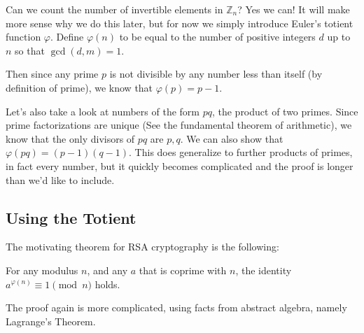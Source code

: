 \documentclass{article}
\begin{document}
Can we count the number of invertible elements in $\mathbb{Z}_n$? Yes we can! It will make more sense why we do this later, but for now we simply introduce Euler's totient function $\varphi$. Define $\varphi(n)$ to be equal to the number of positive integers $d$ up to $n$ so that $\gcd(d,m)=1$.

Then since any prime $p$ is not divisible by any number less than itself (by definition of prime), we know that $\varphi(p)=p-1$.

Let's also take a look at numbers of the form $pq$, the product of two primes. Since prime factorizations are unique (See the fundamental theorem of arithmetic), we know that the only divisors of $pq$ are $p,q$. We can also show that $\varphi(pq)=(p-1)(q-1)$. This does generalize to further products of primes, in fact every number, but it quickly becomes complicated and the proof is longer than we'd like to include.

\subsection{Using the Totient}

The motivating theorem for RSA cryptography is the following:

For any modulus $n$, and any $a$ that is coprime with $n$, the identity $a^{\varphi(n)}\equiv 1\pmod{n} $ holds.

The proof again is more complicated, using facts from abstract algebra, namely Lagrange's Theorem. 
\end{document}
